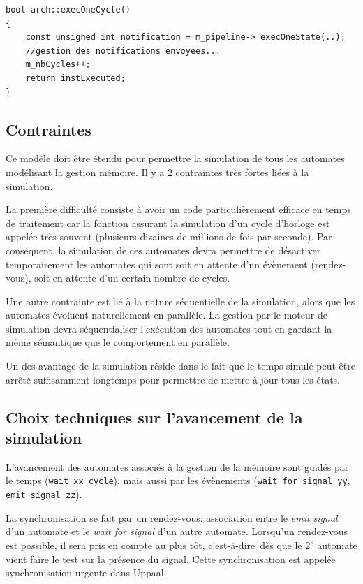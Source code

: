\documentclass[11pt,a4paper]{article}
\newcommand{\cad}{c'est-à-dire}
\begin{document}
\lstset{language=C}
\begin{lstlisting}
bool arch::execOneCycle()
{
	const unsigned int notification = m_pipeline-> execOneState(..);
	//gestion des notifications envoyees...
	m_nbCycles++;
	return instExecuted;
}
\end{lstlisting}

\subsection{Contraintes}
Ce modèle doit être étendu pour permettre la simulation de tous les automates modélisant la gestion mémoire. Il y a 2 contraintes très fortes liées à la simulation.

La première difficulté consiste à avoir un code particulièrement efficace en temps de traitement car la fonction assurant la simulation d'un cycle d'horloge est appelée très souvent (plusieurs dizaines de millions de fois par seconde). Par conséquent, la simulation de ces automates devra permettre de désactiver temporairement les automates qui sont soit en attente d'un évènement (rendez-vous), soit en attente d'un certain nombre de cycles.

Une autre contrainte est lié à la nature séquentielle de la simulation, alors que les automates évoluent naturellement en parallèle. La gestion par le moteur de simulation devra séquentialiser l'exécution des automates tout en gardant la même sémantique que le comportement en parallèle.

Un des avantage de la simulation réside dans le fait que le temps simulé peut-être arrêté suffisamment longtemps pour permettre de mettre à jour tous les états.

\subsection{Choix techniques sur l'avancement de la simulation}

L'avancement des automates associés à la gestion de la mémoire sont guidés par le temps (\texttt{wait xx cycle}), mais aussi par les évènements (\texttt{wait for signal yy}, \texttt{emit signal zz}). 

La synchronisation se fait par un rendez-vous: association entre le \emph{emit signal} d'un automate et le \emph{wait for signal} d'un autre automate. Lorsqu'un rendez-vous est possible, il sera pris en compte au plus tôt, \cad\ dès que le $2^{e}$ automate vient faire le test sur la présence du signal. Cette synchronisation est appelée synchronisation urgente dans Uppaal.
\end{document}
